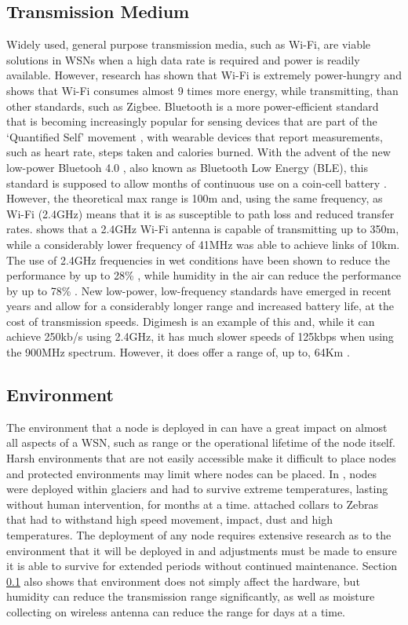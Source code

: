 \subsection{Transmission Medium}\label{bg:trans}
	Widely used, general purpose transmission media, such as Wi-Fi, are viable solutions in WSNs when a high data rate is required and power is readily available. However, research has shown that Wi-Fi is extremely power-hungry and \cite{Lee2007} shows that Wi-Fi consumes almost 9 times more energy, while transmitting, than other standards, such as Zigbee.
	Bluetooth is a more power-efficient standard that is becoming increasingly popular for sensing devices that are part of the `Quantified Self' movement \cite{Swan2012}, with wearable devices that report measurements, such as heart rate, steps taken and calories burned. With the advent of the new low-power Bluetooh 4.0 , also known as Bluetooth Low Energy (BLE), this standard is supposed to allow months of continuous use on a coin-cell battery \cite{gomez2012overview}. However, the theoretical max range is 100m and, using the same frequency, as Wi-Fi (2.4GHz) means that it is as susceptible to path loss and reduced transfer rates.
	\cite{Zennaro} shows that a 2.4GHz Wi-Fi antenna is capable of transmitting up to 350m, while a considerably lower frequency of 41MHz was able to achieve links of 10km. The use of 2.4GHz frequencies in wet conditions have been shown to reduce the performance by up to 28\% \cite{Markham2010}, while humidity in the air can reduce the performance by up to 78\% \cite{Figueiredo2009}.
	New low-power, low-frequency standards have emerged in recent years and allow for a considerably longer range and increased battery life, at the cost of transmission speeds. Digimesh is an example of this and, while it can achieve 250kb/s using 2.4GHz, it has much slower speeds of 125kbps when using the 900MHz spectrum. However, it does offer a range of, up to, 64Km \cite{Bayat2012}.

\subsection{Environment}
	The environment that a node is deployed in can have a great impact on almost all aspects of a WSN, such as range or the operational lifetime of the node itself. Harsh environments that are not easily accessible make it difficult to place nodes and protected environments may limit where nodes can be placed. 
	In \cite{Martinez2004}, nodes were deployed within glaciers and had to survive extreme temperatures, lasting without human intervention, for months at a time. \cite{Martonosi2003} attached collars to Zebras that had to withstand high speed movement, impact, dust and high temperatures. The deployment of any node requires extensive research as to the environment that it will be deployed in and adjustments must be made to ensure it is able to survive for extended periods without continued maintenance.
	Section \ref{bg:trans} also shows that environment does not simply affect the hardware, but humidity can reduce the transmission range significantly, as well as moisture collecting on wireless antenna can reduce the range for days at a time.

